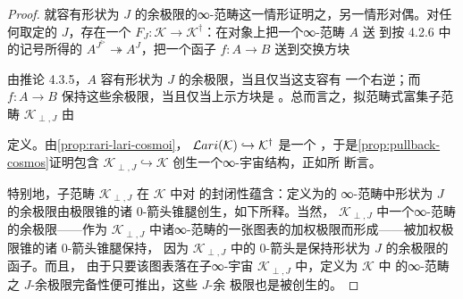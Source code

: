 \begin{proof}
就容有形状为 $J$ 的余极限的∞-范畴这一情形证明之，另一情形对偶。对任何取定的%
\trSimplicialSet{} $J$，存在一个\trCosmologicalFunctor{}
$F_{J}\colon\mathcal{K}\to\mathcal{K}^{\dagger}$：在对象上把一个∞-范畴 $A$ 送
到按 4.2.6 中的记号所得的\trIsofibration{}
$A^{J^{\triangleright}}\twoheadrightarrow A^{J}$，把一个函子 $f\colon A\to B$
送到交换方块
\begin{center}
\end{center}
由推论 4.3.5，$A$ 容有形状为 $J$ 的余极限，当且仅当这支\trIsofibration{}容有
一个\trLeftAdjoint{}右逆；而 $f\colon A\to B$ 保持这些余极限，当且仅当上示方块是%
\trExactSquare{}。总而言之，拟范畴式富集子范畴 $\mathcal{K}_{\perp,J}$ 由\trPullback
\begin{center}
\end{center}
定义。由\cref{prop:rari-lari-cosmoi}，
$\mathcal{L}ari(\mathcal{K})\hookrightarrow\mathcal{K}^{\dagger}$ 是一个%
\trCosmologicalEmbedding{}，于是\cref{prop:pullback-cosmos}证明包含
$\mathcal{K}_{\perp,J}\hookrightarrow\mathcal{K}$ 创生一个∞-宇宙结构，正如所
断言。

特别地，子范畴 $\mathcal{K}_{\perp,J}$ 在 $\mathcal{K}$ 中对%
\trFlexibleWeightedLimit{}的封闭性蕴含：定义为\trFlexibleWeightedLimit{}的
∞-范畴中形状为 $J$ 的余极限由极限锥的诸 0-箭头锥腿创生，如下所释。当然，
$\mathcal{K}_{\perp,J}$ 中一个∞-范畴的余极限——作为 $\mathcal{K}_{\perp,J}$
中诸∞-范畴的一张图表的加权极限而形成——被加权极限锥的诸 0-箭头锥腿保持，
因为 $\mathcal{K}_{\perp,J}$ 中的 0-箭头是保持形状为 $J$ 的余极限的函子。而且，
由于只要该图表落在子∞-宇宙 $\mathcal{K}_{\perp,J}$ 中，定义为 $\mathcal{K}$ 中%
\trFlexibleWeightedLimit{}的∞-范畴之 $J$-余极限完备性便可推出，这些 $J$-余
极限也是被创生的。
\end{proof}

